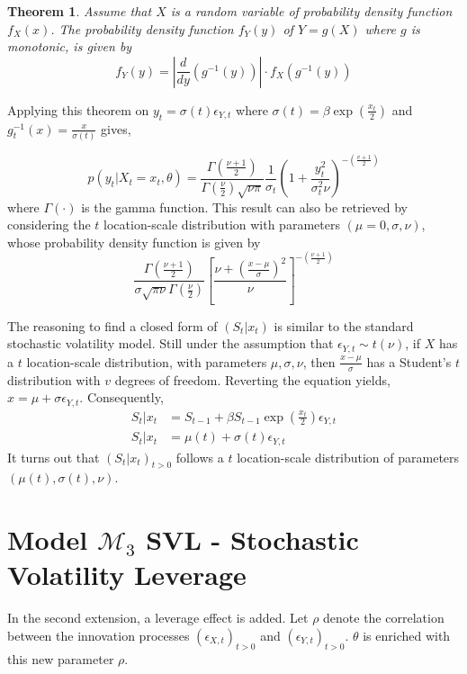 \documentclass[11pt,a4,twosided,singlespacing,titlepagenumber=on]{scrreprt}
\numberwithin{equation}{chapter} %
\newtheorem{theorem}{Theorem}%
\theoremstyle{remark}
\begin{document}
\begin{theorem}
\textit{
Assume that $X$ is a random variable of probability density function $f_X(x)$. The probability density function $f_Y(y)$ of $Y=g(X)$ where $g$ is monotonic, is given by
}
$$f_Y(y) = \left|\frac{d}{dy}(g^{-1}(y))\right| \cdot f_X(g^{-1}(y))$$
\end{theorem}

\noindent
Applying this theorem on $y_t = \sigma(t) \epsilon_{Y,t}$ where $\sigma(t) = \beta \exp \left(\frac{x_t}{2} \right)$ and $g^{-1}_t(x) = \frac{x}{\sigma(t)}$ gives,

$$p(y_t | X_t = x_t, \theta) = \frac{\Gamma(\frac{\nu+1}{2})}{\Gamma(\frac{\nu}{2}) \sqrt{\nu\pi}} \frac{1}{\sigma_t}\left( 1 + \frac{y_t^2}{\sigma_t^2 \nu}\right)^{-\left(\frac{v+1}{2} \right)}$$
where $\Gamma(\cdot)$ is the gamma function. This result can also be retrieved by considering the $t$ location-scale distribution with parameters $(\mu = 0, \sigma, \nu)$, whose probability density function is given by
$$\frac{\Gamma \left(\frac{\nu+1}{2} \right)}{\sigma \sqrt{\pi \nu} \Gamma \left(\frac{\nu}{2} \right)} \left[ \frac{\nu + \left( \frac{x-\mu}{\sigma}\right)^2}{\nu}\right]^{-\left(\frac{\nu+1}{2} \right)}$$

The reasoning to find a closed form of $(S_t | x_t)$ is similar to the standard stochastic volatility model. Still under the assumption that $\epsilon_{Y,t} \sim t(\nu)$, if $X$ has a $t$ location-scale distribution, with parameters $\mu, \sigma, \nu$, then $\frac{x-\mu}{\sigma}$ has a Student's $t$ distribution with $v$ degrees of freedom. Reverting the equation yields, $x = \mu + \sigma \epsilon_{Y,t}$. Consequently,
\begin{align*}
S_t | x_t &= S_{t-1} + \beta S_{t-1} \exp \left( \frac{x_t}{2} \right) \epsilon_{Y,t} \\
S_t | x_t &= \mu(t) + \sigma(t) \epsilon_{Y,t}
\end{align*}
It turns out that $(S_t | x_t)_{t>0}$ follows a $t$ location-scale distribution of parameters $(\mu(t), \sigma(t), \nu)$.

\section{Model $\mathcal{M}_3$ SVL - Stochastic Volatility Leverage}
In the second extension, a leverage effect is added. Let $\rho$ denote the correlation between the innovation processes $(\epsilon_{X,t})_{t>0}$ and $(\epsilon_{Y,t})_{t>0}$. $\theta$ is enriched with this new parameter $\rho$.
\end{document}
